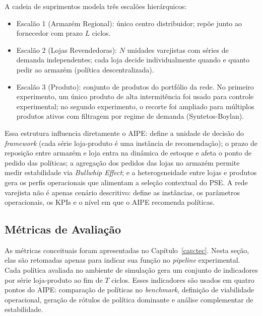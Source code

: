 A cadeia de suprimentos modela três escalões hierárquicos:

\begin{itemize}
  \item Escalão 1 (Armazém Regional): único centro distribuidor; repõe junto ao fornecedor com prazo $L$ ciclos.
  \item Escalão 2 (Lojas Revendedoras): $N$ unidades varejistas com séries de demanda independentes; cada loja decide individualmente quando e quanto pedir ao armazém (política descentralizada).
  \item Escalão 3 (Produto): conjunto de produtos do portfólio da rede. No primeiro experimento, um único produto de alta intermitência foi usado para controle experimental; no segundo experimento, o recorte foi ampliado para múltiplos produtos ativos com filtragem por regime de demanda (Syntetos-Boylan).
\end{itemize}

Essa estrutura influencia diretamente o AIPE: define a unidade de decisão do \textit{framework} (cada série loja-produto é uma instância de recomendação); o prazo de reposição entre armazém e loja entra na dinâmica de estoque e afeta o ponto de pedido das políticas; a agregação dos pedidos das lojas no armazém permite medir estabilidade via \textit{Bullwhip Effect}; e a heterogeneidade entre lojas e produtos gera os perfis operacionais que alimentam a seleção contextual do PSE. A rede varejista não é apenas cenário descritivo: define as instâncias, os parâmetros operacionais, os KPIs e o nível em que o AIPE recomenda políticas.

\subsection{Métricas de Avaliação}
\label{sec:metricas_avaliacao}

As métricas conceituais foram apresentadas no Capítulo~\ref{cap:tec}. Nesta seção, elas são retomadas apenas para indicar sua função no \textit{pipeline} experimental. Cada política avaliada no ambiente de simulação gera um conjunto de indicadores por série loja-produto ao fim de $T$ ciclos. Esses indicadores são usados em quatro pontos do AIPE: comparação de políticas no \textit{benchmark}, definição de viabilidade operacional, geração de rótulos de política dominante e análise complementar de estabilidade.

